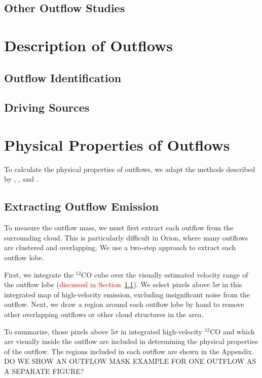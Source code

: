 \documentclass[twocolumn]{aastex62}
\begin{document}
\subsection{Other Outflow Studies}

\section{Description of Outflows}

\subsection{Outflow Identification}\label{sec:identification}

\subsection{Driving Sources}


\section{Physical Properties of Outflows}
To calculate the physical properties of outflows, we adapt the methods described by \citet{Arce01}, \citet{Dunham14}, and \citet{ZhangY16}. 

\subsection{Extracting Outflow Emission}\label{sec:extraction}
To measure the outflow mass, we must first extract each outflow from the surrounding cloud. This is particularly difficult in Orion, where many outflows are clustered and overlapping. We use a two-step approach to extract each outflow lobe.

First, we integrate the $^{12}$CO cube over the visually estimated velocity range of the outflow lobe (\textcolor{red}{discussed in Section~\ref{sec:identification}}). We select pixels above $5\sigma$ in this integrated map of high-velocity emission, excluding insignificant noise from the outflow. Next, we draw a region around each outflow lobe by hand to remove other overlapping outflows or other cloud structures in the area. %

To summarize, those pixels above $5\sigma$ in integrated high-velocity $^{12}$CO and which are visually inside the outflow are included in determining the physical properties of the outflow. The regions included in each outflow are shown in the Appendix. DO WE SHOW AN OUTFLOW MASK EXAMPLE FOR ONE OUTFLOW AS A SEPARATE FIGURE? 
\end{document}
